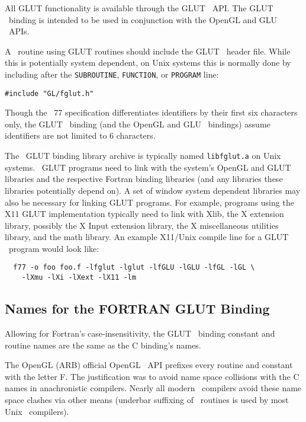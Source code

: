\documentclass[titlepage,twoside]{article}
\begin{document}
All GLUT functionality is available through the GLUT \Fortran\ API.
The GLUT \Fortran\ binding is intended to be used in conjunction with the OpenGL and GLU
\Fortran\ APIs.

A \Fortran\ routine using GLUT routines should include the GLUT \Fortran\
header file.  While this is potentially system dependent, on Unix
systems this is normally done by including after the {\tt SUBROUTINE},
{\tt FUNCTION}, or {\tt PROGRAM} line:
\begin{verbatim}
#include "GL/fglut.h"
\end{verbatim}

Though the \Fortran\ 77 specification differentiates identifiers by
their first six characters only, the GLUT \Fortran\ binding (and the OpenGL
and GLU \Fortran\ bindings) assume identifiers are not limited to 6
characters.

The \Fortran\ GLUT binding library archive is typically named {\tt libfglut.a} on Unix
systems.  \Fortran\ GLUT programs need to link with the system's OpenGL and GLUT libraries
and the respective Fortran binding libraries
(and any libraries these libraries potentially depend on).
A set of window system dependent libraries may also be necessary
for linking GLUT programs.  For example, programs using the X11 GLUT
implementation typically need to link with Xlib, the X extension
library, possibly the X Input extension library,  the X miscellaneous
utilities library, and the math library.  An example X11/Unix
compile line for a GLUT \Fortran\ program would look like:
\begin{verbatim}
  f77 -o foo foo.f -lfglut -lglut -lfGLU -lGLU -lfGL -lGL \
    -lXmu -lXi -lXext -lX11 -lm
\end{verbatim}

\subsection{Names for the FORTRAN GLUT Binding}

Allowing for {\sc Fortran}'s case-insensitivity, the GLUT \Fortran\ binding
constant and routine names are the same as the C binding's names.

The OpenGL \ndx{Architectural Review Board} (ARB) official OpenGL \Fortran\ API prefixes every routine and
constant with the letter F.  The justification was to avoid name
space collisions with the C names in anachronistic compilers.  Nearly
all modern \Fortran\ compilers avoid these name space clashes via other
means (underbar suffixing of \Fortran\ routines is used by most Unix \Fortran\
compilers).
\end{document}

